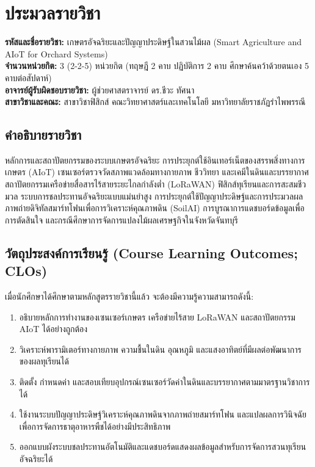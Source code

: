 \chapter*{ประมวลรายวิชา}

\noindent\textbf{รหัสและชื่อรายวิชา:} เกษตรอัจฉริยะและปัญญาประดิษฐ์ในสวนไม้ผล (Smart Agriculture and AIoT for Orchard Systems)\\[0.2cm]
\noindent\textbf{จำนวนหน่วยกิต:} 3 (2-2-5) หน่วยกิต (ทฤษฎี 2 คาบ ปฏิบัติการ 2 คาบ ศึกษาค้นคว้าด้วยตนเอง 5 คาบต่อสัปดาห์)\\[0.2cm]
\noindent\textbf{อาจารย์ผู้รับผิดชอบรายวิชา:} ผู้ช่วยศาสตราจารย์ ดร.ชีวะ ทัศนา\\[0.2cm]
\noindent\textbf{สาขาวิชาและคณะ:} สาขาวิชาฟิสิกส์ คณะวิทยาศาสตร์และเทคโนโลยี มหาวิทยาลัยราชภัฏรำไพพรรณี

\section*{คำอธิบายรายวิชา}
หลักการและสถาปัตยกรรมของระบบเกษตรอัจฉริยะ การประยุกต์ใช้อินเทอร์เน็ตของสรรพสิ่งทางการเกษตร (AIoT) เซนเซอร์ตรวจวัดสภาพแวดล้อมทางกายภาพ ชีววิทยา และเคมีในดินและบรรยากาศ สถาปัตยกรรมเครือข่ายสื่อสารไร้สายระยะไกลกำลังต่ำ (LoRaWAN) ฟิสิกส์ทุเรียนและการสะสมชีวมวล ระบบการชลประทานอัจฉริยะแบบแม่นยำสูง การประยุกต์ใช้ปัญญาประดิษฐ์และการประมวลผลภาพถ่ายดิจิทัลสมาร์ทโฟนเพื่อการวิเคราะห์คุณภาพดิน (SoilAI) การบูรณาการแดชบอร์ดข้อมูลเพื่อการตัดสินใจ และกรณีศึกษาการจัดการแปลงไม้ผลเศรษฐกิจในจังหวัดจันทบุรี

\section*{วัตถุประสงค์การเรียนรู้ (Course Learning Outcomes; CLOs)}
เมื่อนักศึกษาได้ศึกษาตามหลักสูตรรายวิชานี้แล้ว จะต้องมีความรู้ความสามารถดังนี้:
\begin{enumerate}
    \item อธิบายหลักการทำงานของเซนเซอร์เกษตร เครือข่ายไร้สาย LoRaWAN และสถาปัตยกรรม AIoT ได้อย่างถูกต้อง
    \item วิเคราะห์พารามิเตอร์ทางกายภาพ ความชื้นในดิน อุณหภูมิ และแสงอาทิตย์ที่มีผลต่อพัฒนาการของผลทุเรียนได้
    \item ติดตั้ง กำหนดค่า และสอบเทียบอุปกรณ์เซนเซอร์วัดค่าในดินและบรรยากาศตามมาตรฐานวิชาการได้
    \item ใช้งานระบบปัญญาประดิษฐ์วิเคราะห์คุณภาพดินจากภาพถ่ายสมาร์ทโฟน และแปลผลการวินิจฉัยเพื่อการจัดการธาตุอาหารพืชได้อย่างมีประสิทธิภาพ
    \item ออกแบบผังระบบชลประทานอัตโนมัติและแดชบอร์ดแสดงผลข้อมูลสำหรับการจัดการสวนทุเรียนอัจฉริยะได้
\end{enumerate}

